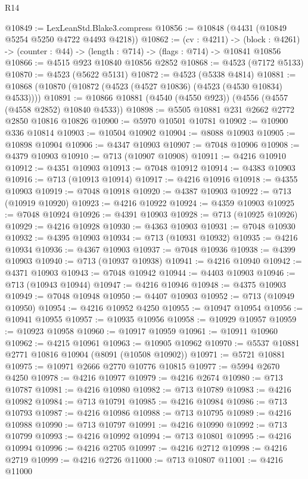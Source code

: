 \begin{lexlean}{R14}
\begin{coremodule}
@10849 := LexLeanStd.Blake3.compress
@10856 := @10848 (@4431 (@10849 @5254 @5250 @4722 @4493 @4218))
@10862 := (cv : @4211) ->
  (block : @4261) -> (counter : @44) -> (length : @714) -> (flags : @714) -> @10841 @10856
@10866 := @4515 @923 @10840 @10856 @2852
@10868 := @4523 (@7172 @5133)
@10870 := @4523 (@5622 @5131)
@10872 := @4523 (@5338 @4814)
@10881 := @10868 (@10870 (@10872 (@4523 (@4527 @10836) (@4523 (@4530 @10834) @4533))))
@10891 := @10866 @10881 (@4540 (@4550 @923)) (@4556 (@4557 (@4558 @2852) @10840 @4533))
@10898 := @5505 @10881 @231 @2662 @2772 @2850 @10816 @10826
@10900 := @5970 @10501 @10781
@10902 := @10900 @336 @10814
@10903 := @10504 @10902
@10904 := @8088 @10903
@10905 := @10898 @10904
@10906 := @4347 @10903
@10907 := @7048 @10906
@10908 := @4379 @10903
@10910 := @713 (@10907 @10908)
@10911 := @4216 @10910
@10912 := @4351 @10903
@10913 := @7048 @10912
@10914 := @4383 @10903
@10916 := @713 (@10913 @10914)
@10917 := @4216 @10916
@10918 := @4355 @10903
@10919 := @7048 @10918
@10920 := @4387 @10903
@10922 := @713 (@10919 @10920)
@10923 := @4216 @10922
@10924 := @4359 @10903
@10925 := @7048 @10924
@10926 := @4391 @10903
@10928 := @713 (@10925 @10926)
@10929 := @4216 @10928
@10930 := @4363 @10903
@10931 := @7048 @10930
@10932 := @4395 @10903
@10934 := @713 (@10931 @10932)
@10935 := @4216 @10934
@10936 := @4367 @10903
@10937 := @7048 @10936
@10938 := @4399 @10903
@10940 := @713 (@10937 @10938)
@10941 := @4216 @10940
@10942 := @4371 @10903
@10943 := @7048 @10942
@10944 := @4403 @10903
@10946 := @713 (@10943 @10944)
@10947 := @4216 @10946
@10948 := @4375 @10903
@10949 := @7048 @10948
@10950 := @4407 @10903
@10952 := @713 (@10949 @10950)
@10954 := @4216 @10952 @4250
@10955 := @10947 @10954
@10956 := @10941 @10955
@10957 := @10935 @10956
@10958 := @10929 @10957
@10959 := @10923 @10958
@10960 := @10917 @10959
@10961 := @10911 @10960
@10962 := @4215 @10961
@10963 := @10905 @10962
@10970 := @5537 @10881 @2771 @10816 @10904 (@8091 (@10508 @10902))
@10971 := @5721 @10881
@10975 := @10971 @2666 @2770 @10776 @10815
@10977 := @5994 @2670 @4250
@10978 := @4216 @10977
@10979 := @4216 @2674
@10980 := @713 @10787
@10981 := @4216 @10980
@10982 := @713 @10789
@10983 := @4216 @10982
@10984 := @713 @10791
@10985 := @4216 @10984
@10986 := @713 @10793
@10987 := @4216 @10986
@10988 := @713 @10795
@10989 := @4216 @10988
@10990 := @713 @10797
@10991 := @4216 @10990
@10992 := @713 @10799
@10993 := @4216 @10992
@10994 := @713 @10801
@10995 := @4216 @10994
@10996 := @4216 @2705
@10997 := @4216 @2712
@10998 := @4216 @2719
@10999 := @4216 @2726
@11000 := @713 @10807
@11001 := @4216 @11000

\end{coremodule}
\end{lexlean}

